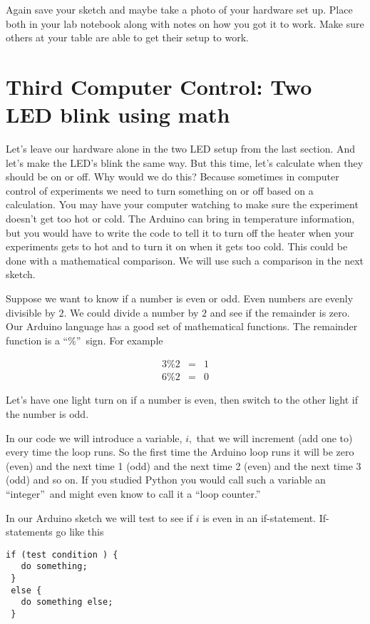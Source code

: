 Again save your sketch and maybe take a photo of your hardware set up. Place
both in your lab notebook along with notes on how you got it to work. Make
sure others at your table are able to get their setup to work.

\section{Third Computer Control: Two LED blink using math}

Let's leave our hardware alone in the two LED setup from the last section.
And let's make the LED's blink the same way. But this time, let's calculate
when they should be on or off. Why would we do this? Because sometimes in
computer control of experiments we need to turn something on or off based on
a calculation. You may have your computer watching to make sure the
experiment doesn't get too hot or cold. The Arduino can bring in temperature
information, but you would have to write the code to tell it to turn off the
heater when your experiments gets to hot and to turn it on when it gets too
cold. This could be done with a mathematical comparison. We will use such a
comparison in the next sketch.

Suppose we want to know if a number is even or odd. Even numbers are evenly
divisible by $2.$ We could divide a number by $2$ and see if the remainder
is zero. Our Arduino language has a good set of mathematical functions. The
remainder function is a \textquotedblleft \%\textquotedblright\ sign. For
example 

\begin{eqnarray*}
	3\%2 &=&1 \\
	6\%2 &=&0
\end{eqnarray*}

Let's have one light turn on if a number is even, then switch to the other
light if the number is odd.

In our code we will introduce a variable, $i,$ that we will increment (add
one to) every time the loop runs. So the first time the Arduino loop runs it
will be zero (even) and the next time 1 (odd) and the next time 2 (even) and
the next time 3 (odd) and so on. If you studied Python you would call such a
variable an \textquotedblleft integer\textquotedblright\ and might even know
to call it a \textquotedblleft loop counter.\textquotedblright

In our Arduino sketch we will test to see if $i$ is even in an if-statement.
If-statements go like this
 \begin{lstlisting}[language=Arduino]
 if (test condition ) {
   do something;
 }
 else {
   do something else;
 }
 \end{lstlisting}

